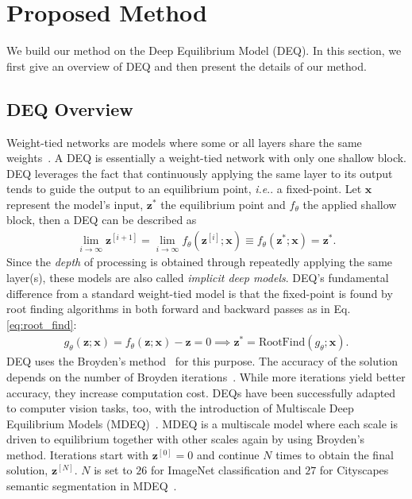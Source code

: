 \documentclass[runningheads]{llncs}
\makeatletter
\DeclareRobustCommand\onedot{\futurelet\@let@token\@onedot}
\def\@onedot{\ifx\@let@token.\else.\null\fi\xspace}
\def\ie{\emph{i.e}\onedot} \def\Ie{\emph{I.e}\onedot}
\makeatother
\begin{document}
\section{Proposed Method}\label{sec:method}


We build our method on the Deep Equilibrium Model (DEQ). In this section, we first give an overview of DEQ and then present the details of our method. 


\subsection{DEQ Overview}


Weight-tied networks are models where some or all layers share the same weights~\cite{bai2018trellis,dehghani2018universal}. A DEQ is essentially a weight-tied network with only one shallow block. DEQ leverages the fact that continuously applying the same layer to its output tends to guide the output to an equilibrium point, \ie a fixed-point. Let $\mathbf{x}$ represent the model’s input, $\mathbf{z}^{*}$ the equilibrium point and $f_\theta$ the applied shallow block, then a DEQ can be described as
\begin{align}
    \lim_{i\to \infty}\mathbf{z}^{[i+1]} = \lim_{i\to \infty} f_\theta (\mathbf{z}^{[i]} ; \mathbf{x}) \equiv f_\theta (\mathbf{z}^{*} ; \mathbf{x}) = \mathbf{z}^{*}. \label{eq:fixed_point_iteration}
\end{align}
Since the {\em depth} of processing is obtained through repeatedly applying the same layer(s), these models are also called {\em implicit deep models}. DEQ’s fundamental difference from a standard weight-tied model is that the fixed-point is found by root finding algorithms in both forward and backward passes as in Eq. \ref{eq:root_find}: 
\begin{align}
     g_\theta (\mathbf{z} ; \mathbf{x}) = f_\theta (\mathbf{z} ; \mathbf{x}) - \mathbf{z} = 0 \implies \mathbf{z}^{*} = \text{RootFind}(g_\theta; \mathbf{x}). \label{eq:root_find}
\end{align}
DEQ uses the Broyden's method~\cite{broyden1965class} for this purpose.  The accuracy of the solution depends on the number of Broyden iterations~\cite{bai2021neural,bai2021stabilizing}.  While more iterations yield better accuracy, they increase computation cost. 
DEQs have been successfully adapted to computer vision tasks, too, with the introduction of Multiscale Deep Equilibrium Models (MDEQ)~\cite{bai2020mdeq}. MDEQ is  a multiscale model where each scale is driven to equilibrium together with other scales again by using Broyden's method. Iterations start with $\mathbf{z}^{[0]}=0$ and continue $N$ times to obtain the final solution, $\mathbf{z}^{[N]}$. $N$ is set to $26$ for ImageNet classification and $27$ for Cityscapes semantic segmentation in MDEQ~\cite{bai2020mdeq}. 
\end{document}
